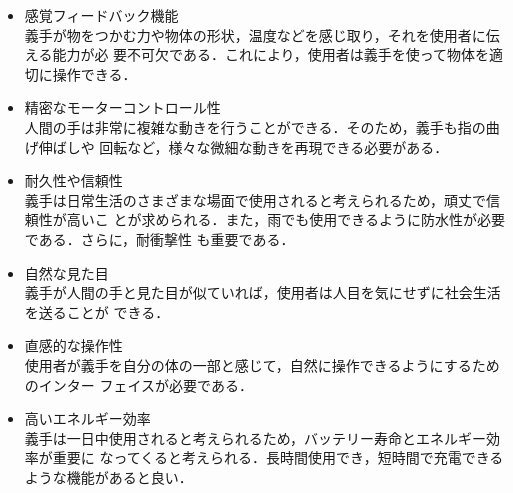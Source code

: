 \documentclass{jsarticle}
\begin{document}
\begin{itemize}
  \addtolength{\itemindent}{5.4zw}
  \item 感覚フィードバック機能\\
  \hspace*{5.5zw}義手が物をつかむ力や物体の形状，温度などを感じ取り，それを使用者に伝える能力が必
  \hspace*{5.5zw}要不可欠である．これにより，使用者は義手を使って物体を適切に操作できる．\\

  \item 精密なモーターコントロール性\\
  \hspace*{5.5zw}人間の手は非常に複雑な動きを行うことができる．そのため，義手も指の曲げ伸ばしや
  \hspace*{5.5zw}回転など，様々な微細な動きを再現できる必要がある．\\

  \item 耐久性や信頼性\\
  \hspace*{5.5zw}義手は日常生活のさまざまな場面で使用されると考えられるため，頑丈で信頼性が高いこ
  \hspace*{5.5zw}とが求められる．また，雨でも使用できるように防水性が必要である．さらに，耐衝撃性
  \hspace*{5.5zw}も重要である．\\

  \item 自然な見た目\\
  \hspace*{5.5zw}義手が人間の手と見た目が似ていれば，使用者は人目を気にせずに社会生活を送ることが
  \hspace*{5.5zw}できる．\\

  \item 直感的な操作性\\
  \hspace*{5.5zw}使用者が義手を自分の体の一部と感じて，自然に操作できるようにするためのインター
  \hspace*{5.5zw}フェイスが必要である．\\

  \item 高いエネルギー効率\\
  \hspace*{5.5zw}義手は一日中使用されると考えられるため，バッテリー寿命とエネルギー効率が重要に
  \hspace*{5.5zw}なってくると考えられる．長時間使用でき，短時間で充電できるような機能があると良い．\\


\end{itemize}
\end{document}
